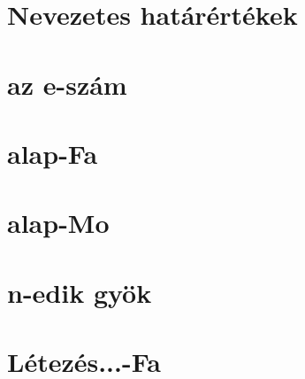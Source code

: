 








\begin{spacing}{1.2}

\section*{Nevezetes határértékek} \label{DB}
\newline
{}
\newpage
\section*{az e-szám} \label{DBe}
\vspace{0.5cm}
\newpage
\section*{alap-Fa} \label{DBe1}
\Fa{

}
\vspace{0.5cm}
\newpage
\section*{alap-Mo} \label{DBe1Mo}
\Mo{

}
\vspace{0.5cm}
\newpage
\section*{n-edik gyök} \label{DBnthroot}
\newline
{}
\newline
{}
\newline
{}
\newline
{}
\vspace{0.5cm}
\newpage
\section*{Létezés...-Fa} \label{DBnthrootSum}
\Fa{

}
\vspace{0.5cm}
\newpage

\end{spacing}
